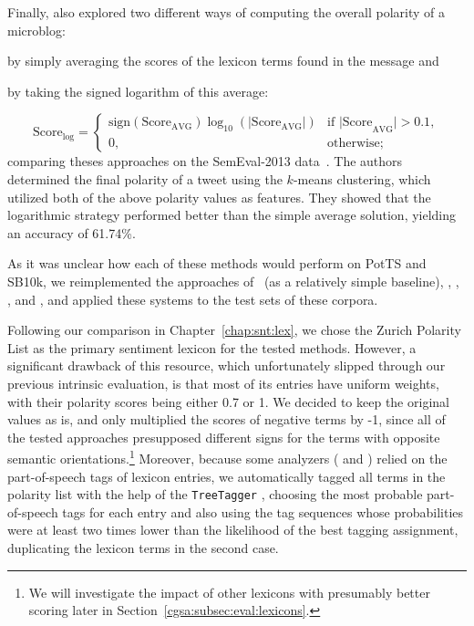 Finally, \citet{Kolchyna:15} also explored two different ways of
computing the overall polarity of a microblog:
\begin{inparaenum}[(i)]
\item by simply averaging the scores of the lexicon terms found in the
  message and
\item by taking the signed logarithm of this average:
\end{inparaenum}
\begin{equation*}
  \text{Score}_{\log} =
  \begin{cases}
    \text{sign}(\text{Score}_{\text{AVG}})\log_{10}(|\text{Score}_{\text{AVG}}|) & %
    \text{if |Score}_{\text{AVG}}| > 0.1,\\
    0, & \text{otherwise};
  \end{cases}
\end{equation*}%
comparing theses approaches on the SemEval-2013 data~\cite{Nakov:13}.
The authors determined the final polarity of a tweet using the
$k$-means clustering, which utilized both of the above polarity values
as features.  They showed that the logarithmic strategy performed
better than the simple average solution, yielding an accuracy of
61.74\%.  %

As it was unclear how each of these methods would perform on PotTS and
SB10k, we reimplemented the approaches of~\citet{Hu:04} (as a
relatively simple baseline), \citet{Taboada:11}, \citet{Musto:14},
\citet{Jurek:15}, and \citet{Kolchyna:15}, and applied these systems
to the test sets of these corpora.

Following our comparison in Chapter~\ref{chap:snt:lex}, we chose the
Zurich Polarity List as the primary sentiment lexicon for the tested
methods.  However, a significant drawback of this resource, which
unfortunately slipped through our previous intrinsic evaluation, is
that most of its entries have uniform weights, with their polarity
scores being either 0.7 or 1.  We decided to keep the original values
as is, and only multiplied the scores of negative terms by -1, since
all of the tested approaches presupposed different signs for the terms
with opposite semantic orientations.\footnote{We will investigate the
  impact of other lexicons with presumably better scoring later in
  Section~\ref{cgsa:subsec:eval:lexicons}.}  Moreover, because some
analyzers (\eg{} \citet{Taboada:11} and \citet{Musto:14}) relied on
the part-of-speech tags of lexicon entries, we automatically tagged
all terms in the polarity list with the help of the
\texttt{TreeTagger} \cite{Schmid:95}, choosing the most probable
part-of-speech tags for each entry and also using the tag sequences
whose probabilities were at least two times lower than the likelihood
of the best tagging assignment, duplicating the lexicon terms in the
second case.


